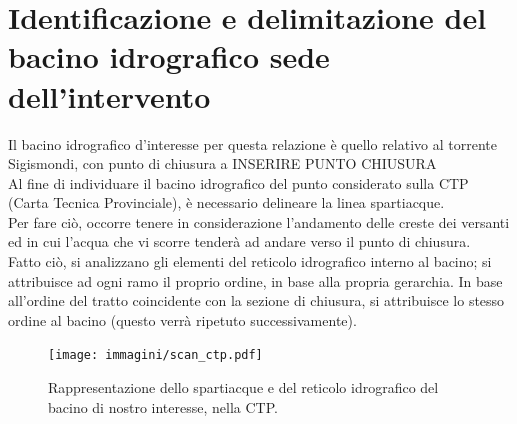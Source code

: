 \section{Identificazione e delimitazione del bacino idrografico sede dell'intervento}
Il bacino idrografico d'interesse per questa relazione è quello relativo al torrente Sigismondi, con punto di chiusura a INSERIRE PUNTO CHIUSURA\\
Al fine di individuare il bacino idrografico del punto considerato sulla CTP (Carta Tecnica Provinciale), è necessario delineare la linea spartiacque.\\
Per fare ciò, occorre tenere in considerazione l'andamento delle creste dei versanti ed in cui l'acqua che vi scorre tenderà ad andare verso il punto di chiusura.\\
Fatto ciò, si analizzano gli elementi del reticolo idrografico interno al bacino; si attribuisce ad ogni ramo il proprio ordine, in base alla propria gerarchia. In base all'ordine del tratto coincidente con la sezione di chiusura, si attribuisce lo stesso ordine al bacino (questo verrà ripetuto successivamente).
\begin{figure}[H]\centering
    \texttt{[image: immagini/scan\_ctp.pdf]}
    \caption{Rappresentazione dello spartiacque e del reticolo idrografico del bacino di nostro interesse, nella CTP.}
  \label{scan_ctp}
\end{figure}


